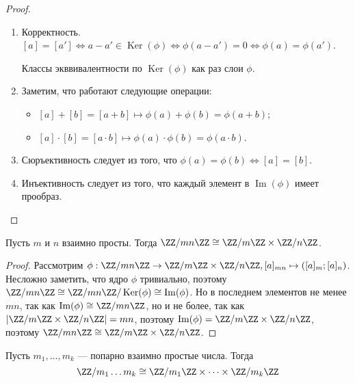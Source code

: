 \documentclass[12pt,a4paper]{article}
\DeclareMathOperator{\Img}{Im}
\DeclareMathOperator{\Ker}{Ker}
\begin{document}
    \begin{proof}\ 
        \begin{enumerate}
            \item Корректность. $[a] = [a'] \Leftrightarrow a - a' \in \Ker(\phi) \Leftrightarrow \phi(a - a') = 0 \Leftrightarrow \phi(a) = \phi(a')$.
                \begin{remark}
                    Классы экввивалентности по $\Ker(\phi)$ как раз слои $\phi$.
                \end{remark}
            \item Заметим, что работают следующие операции:
                \begin{itemize}
                    \item $[a] + [b] = [a + b] \mapsto \phi(a) + \phi(b) = \phi(a + b)$;
                    \item $[a] \cdot [b] = [a \cdot b] \mapsto \phi(a) \cdot \phi(b) = \phi(a \cdot b)$. 
                \end{itemize}
            \item Сюръективность следует из того, что $\phi(a) = \phi(b) \Leftrightarrow [a] = [b]$.
            \item Инъективность следует из того, что каждый элемент в $\Img(\phi)$ имеет прообраз.
        \end{enumerate}
    \end{proof}

    \begin{theorem}
        Пусть $m$ и $n$ взаимно просты. Тогда $\ZZ/mn\ZZ \cong \ZZ/m\ZZ \times \ZZ/n\ZZ$.
    \end{theorem}

    \begin{proof}
        Рассмотрим $\phi: \ZZ/mn\ZZ \to \ZZ/m\ZZ \times \ZZ/n\ZZ, [a]_{mn} \mapsto ([a]_m; [a]_n)$. Несложно заметить, что ядро $\phi$ тривиально, поэтому $\ZZ/mn\ZZ \cong \ZZ/mn\ZZ/\Ker(\phi) \cong \Img(\phi)$. Но в последнем элементов не менее $mn$, так как $\Img(\phi) \cong \ZZ/mn\ZZ$, но и не более, так как $|\ZZ/m\ZZ \times \ZZ/n\ZZ| = mn$, поэтому $\Img(\phi) = \ZZ/m\ZZ \times \ZZ/n\ZZ$, поэтому $\ZZ/mn\ZZ \cong \ZZ/m\ZZ \times \ZZ/n\ZZ$.
    \end{proof}

    \begin{theorem}[КТО]
        Пусть $m_1, \dots, m_k$ --- попарно взаимно простые числа. Тогда
        \[\ZZ/m_1\dots m_k \cong \ZZ/m_1\ZZ \times \dots \times \ZZ/m_k\ZZ\]
    \end{theorem}
\end{document}
